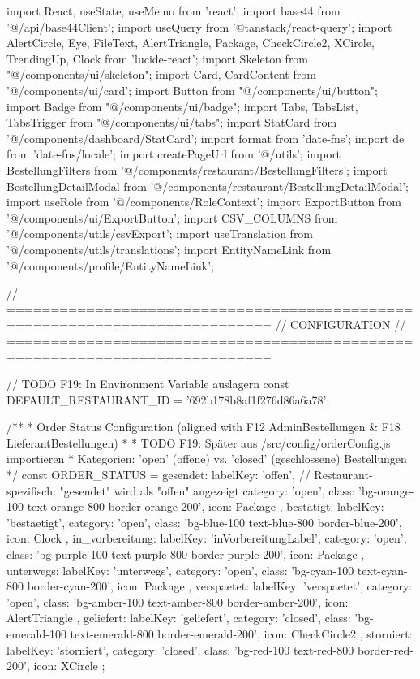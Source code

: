 import React, { useState, useMemo } from 'react';
import { base44 } from '@/api/base44Client';
import { useQuery } from '@tanstack/react-query';
import { AlertCircle, Eye, FileText, AlertTriangle, Package, CheckCircle2, XCircle, TrendingUp, Clock } from 'lucide-react';
import { Skeleton } from "@/components/ui/skeleton";
import { Card, CardContent } from '@/components/ui/card';
import { Button } from "@/components/ui/button";
import { Badge } from "@/components/ui/badge";
import { Tabs, TabsList, TabsTrigger } from "@/components/ui/tabs";
import StatCard from '@/components/dashboard/StatCard';
import { format } from 'date-fns';
import { de } from 'date-fns/locale';
import { createPageUrl } from '@/utils';
import BestellungFilters from '@/components/restaurant/BestellungFilters';
import BestellungDetailModal from '@/components/restaurant/BestellungDetailModal';
import { useRole } from '@/components/RoleContext';
import ExportButton from '@/components/ui/ExportButton';
import { CSV_COLUMNS } from '@/components/utils/csvExport';
import { useTranslation } from '@/components/utils/translations';
import EntityNameLink from '@/components/profile/EntityNameLink';

// ============================================================================
// CONFIGURATION
// ============================================================================

// TODO F19: In Environment Variable auslagern
const DEFAULT_RESTAURANT_ID = '692b178b8af1f276d86a6a78';

/**
 * Order Status Configuration (aligned with F12 AdminBestellungen & F18 LieferantBestellungen)
 * 
 * TODO F19: Später aus /src/config/orderConfig.js importieren
 * Kategorien: 'open' (offene) vs. 'closed' (geschlossene) Bestellungen
 */
const ORDER_STATUS = {
  gesendet: { 
    labelKey: 'offen',  // Restaurant-spezifisch: "gesendet" wird als "offen" angezeigt
    category: 'open',
    class: 'bg-orange-100 text-orange-800 border-orange-200',
    icon: Package 
  },
  bestätigt: { 
    labelKey: 'bestaetigt',
    category: 'open',
    class: 'bg-blue-100 text-blue-800 border-blue-200',
    icon: Clock 
  },
  in_vorbereitung: { 
    labelKey: 'inVorbereitungLabel',
    category: 'open',
    class: 'bg-purple-100 text-purple-800 border-purple-200',
    icon: Package 
  },
  unterwegs: { 
    labelKey: 'unterwegs',
    category: 'open',
    class: 'bg-cyan-100 text-cyan-800 border-cyan-200',
    icon: Package 
  },
  verspaetet: { 
    labelKey: 'verspaetet',
    category: 'open',
    class: 'bg-amber-100 text-amber-800 border-amber-200',
    icon: AlertTriangle 
  },
  geliefert: { 
    labelKey: 'geliefert',
    category: 'closed',
    class: 'bg-emerald-100 text-emerald-800 border-emerald-200',
    icon: CheckCircle2 
  },
  storniert: { 
    labelKey: 'storniert',
    category: 'closed',
    class: 'bg-red-100 text-red-800 border-red-200',
    icon: XCircle 
  }
};

